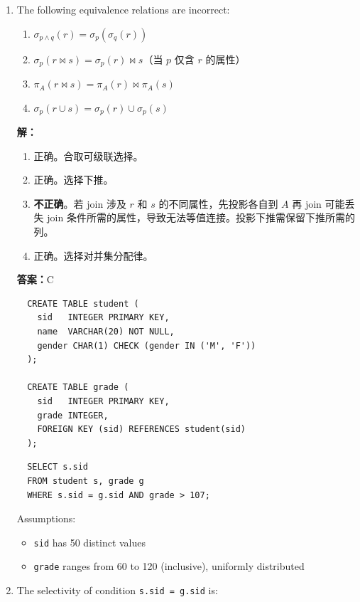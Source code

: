 \documentclass[11pt,a4paper]{article}
\newcommand{\solution}{\par\noindent\textcolor{ansblue}{\textbf{解：}}}
\newcommand{\answer}{\par\noindent\textcolor{ansred}{\textbf{答案：}}}
\begin{document}
\begin{enumerate}[leftmargin=*,itemsep=6pt]

\item The following equivalence relations are incorrect:
  \begin{enumerate}[label=\Alph*.]
    \item $\sigma_{p \land q}(r) = \sigma_p(\sigma_q(r))$
    \item $\sigma_p(r \Join s) = \sigma_p(r) \Join s$（当 $p$ 仅含 $r$ 的属性）
    \item $\pi_A(r \Join s) = \pi_A(r) \Join \pi_A(s)$
    \item $\sigma_p(r \cup s) = \sigma_p(r) \cup \sigma_p(s)$
  \end{enumerate}

  \solution
  \begin{enumerate}[label=\Alph*.]
    \item 正确。合取可级联选择。
    \item 正确。选择下推。
    \item \textbf{不正确}。若 join 涉及 $r$ 和 $s$ 的不同属性，先投影各自到 $A$ 再 join
          可能丢失 join 条件所需的属性，导致无法等值连接。投影下推需保留下推所需的列。
    \item 正确。选择对并集分配律。
  \end{enumerate}

  \answer \textcolor{ansred}{C}

  \begin{verbatim}
  CREATE TABLE student (
    sid   INTEGER PRIMARY KEY,
    name  VARCHAR(20) NOT NULL,
    gender CHAR(1) CHECK (gender IN ('M', 'F'))
  );

  CREATE TABLE grade (
    sid   INTEGER PRIMARY KEY,
    grade INTEGER,
    FOREIGN KEY (sid) REFERENCES student(sid)
  );
  \end{verbatim}

  \begin{verbatim}
  SELECT s.sid
  FROM student s, grade g
  WHERE s.sid = g.sid AND grade > 107;
  \end{verbatim}

  Assumptions:
  \begin{itemize}[nosep]
    \item \texttt{sid} has 50 distinct values
    \item \texttt{grade} ranges from 60 to 120 (inclusive), uniformly distributed
  \end{itemize}

\item The selectivity of condition \texttt{s.sid = g.sid} is:
  \underline{\hspace{2cm}}


\end{enumerate}
\end{document}
